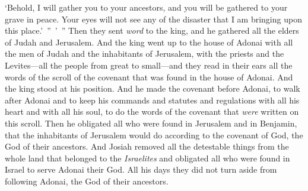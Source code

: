 \begin{biblechapter}
\verse ‘Behold, I will gather you to your ancestors, and you will be gathered to your grave in peace. Your eyes will not see any of the disaster that I am bringing upon this place.’ ” ’ ”
\verse Then they sent \textit{word} to the king, and he gathered all the elders of Judah and Jerusalem.
\verse And the king went up to the house of Adonai with all the men of Judah and the inhabitants of Jerusalem, with the priests and the Levites—all the people from great to small—and they read in their ears all the words of the scroll of the covenant that was found in the house of Adonai.
\verse And the king stood at his position. And he made the covenant before Adonai, to walk after Adonai and to keep his commands and statutes and regulations with all his heart and with all his soul, to do the words of the covenant that \textit{were} written on this scroll.
\verse Then he obligated all who were found in Jerusalem and in Benjamin, that the inhabitants of Jerusalem would do according to the covenant of God, the God of their ancestors.
\verse And Josiah removed all the detestable things from the whole land that belonged to the \textit{Israelites} and obligated all who were found in Israel to serve Adonai their God. All his days they did not turn aside from following Adonai, the God of their ancestors.
\end{biblechapter}

